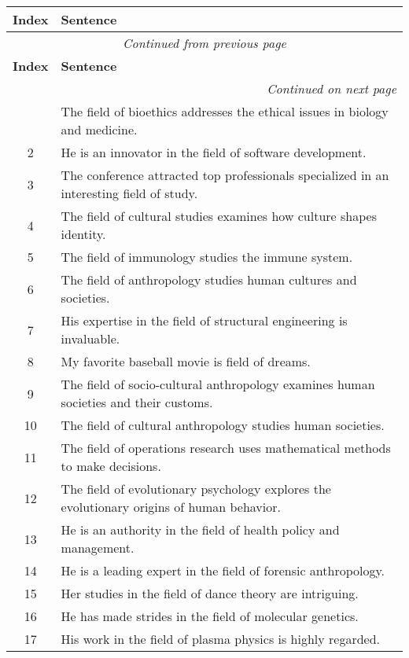 
    \begin{longtable}{|c|p{12cm}|}
    \hline
    \textbf{Index} & \textbf{Sentence} \\ \hline
    \endfirsthead
    \multicolumn{2}{c}{\textit{Continued from previous page}} \\ \hline
    \textbf{Index} & \textbf{Sentence} \\ \hline
    \endhead
    \hline \multicolumn{2}{r}{\textit{Continued on next page}} \\ \hline
    \endfoot
    \hline
    \endlastfoot
    1 & The field of bioethics addresses the ethical issues in biology and medicine. \\ \hline
2 & He is an innovator in the field of software development. \\ \hline
3 & The conference attracted top professionals specialized in an interesting field of study. \\ \hline
4 & The field of cultural studies examines how culture shapes identity. \\ \hline
5 & The field of immunology studies the immune system. \\ \hline
6 & The field of anthropology studies human cultures and societies. \\ \hline
7 & His expertise in the field of structural engineering is invaluable. \\ \hline
8 & My favorite baseball movie is field of dreams. \\ \hline
9 & The field of socio-cultural anthropology examines human societies and their customs. \\ \hline
10 & The field of cultural anthropology studies human societies. \\ \hline
11 & The field of operations research uses mathematical methods to make decisions. \\ \hline
12 & The field of evolutionary psychology explores the evolutionary origins of human behavior. \\ \hline
13 & He is an authority in the field of health policy and management. \\ \hline
14 & He is a leading expert in the field of forensic anthropology. \\ \hline
15 & Her studies in the field of dance theory are intriguing. \\ \hline
16 & He has made strides in the field of molecular genetics. \\ \hline
17 & His work in the field of plasma physics is highly regarded. \\ \hline

\end{longtable}
